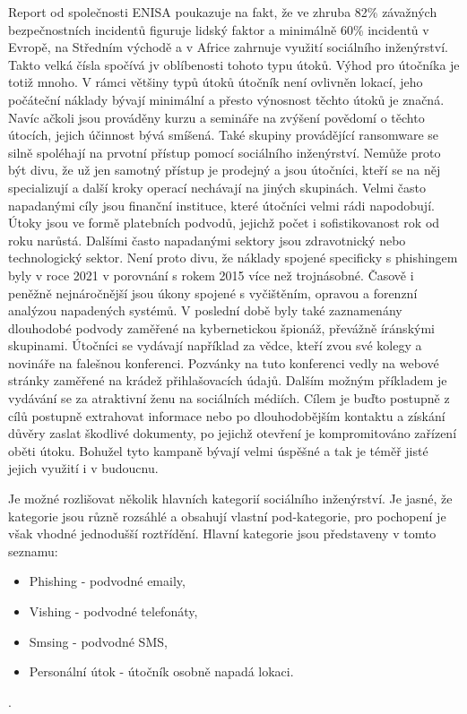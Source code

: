 Report od společnosti \ac{ENISA} poukazuje na fakt, že ve zhruba 82\% závažných bezpečnostních incidentů figuruje lidský faktor a minimálně 60\% incidentů v Evropě, na Středním východě a v Africe zahrnuje využití sociálního inženýrství.
Takto velká čísla spočívá jv oblíbenosti tohoto typu útoků.
Výhod pro útočníka je totiž mnoho.
V rámci většiny typů útoků útočník není ovlivněn lokací, jeho počáteční náklady bývají minimální a přesto výnosnost těchto útoků je značná.
Navíc ačkoli jsou prováděny kurzu a semináře na zvýšení povědomí o těchto útocích, jejich účinnost bývá smíšená.
Také skupiny provádějící ransomware se silně spoléhají na prvotní přístup pomocí sociálního inženýrství.
Nemůže proto být divu, že už jen samotný přístup je prodejný a jsou útočníci, kteří se na něj specializují a další kroky operací nechávají na jiných skupinách.
Velmi často napadanými cíly jsou finanční instituce, které útočníci velmi rádi napodobují.
Útoky jsou ve formě platebních podvodů, jejichž počet i sofistikovanost rok od roku narůstá.
Dalšími často napadanými sektory jsou zdravotnický nebo technologický sektor.
Není proto divu, že náklady spojené specificky s phishingem byly v roce 2021 v porovnání s rokem 2015 více než trojnásobné.
Časově i peněžně nejnáročnější jsou úkony spojené s vyčištěním, opravou a forenzní analýzou napadených systémů.
V poslední době byly také zaznamenány dlouhodobé podvody zaměřené na kybernetickou špionáž, převážně íránskými skupinami.
Útočníci se vydávají například za vědce, kteří zvou své kolegy a novináře na falešnou konferenci.
Pozvánky na tuto konferenci vedly na  webové stránky zaměřené na krádež přihlašovacích údajů.
Dalším možným příkladem je vydávání se za atraktivní ženu na sociálních médiích.
Cílem je buďto postupně z cílů postupně extrahovat informace nebo po dlouhodobějším kontaktu a získání důvěry zaslat škodlivé dokumenty, po jejichž otevření je kompromitováno zařízení oběti útoku.
Bohužel tyto kampaně bývají velmi úspěšné a tak je téměř jisté jejich využití i v budoucnu.\cite{Enisa_thread_landscape}

Je možné rozlišovat několik hlavních kategorií sociálního inženýrství.
Je jasné, že kategorie jsou různě rozsáhlé a obsahují vlastní pod-kategorie, pro pochopení je však vhodné jednodušší roztřídění.
Hlavní kategorie jsou představeny v tomto seznamu:
\begin{itemize}
	\item Phishing - podvodné emaily,
	\item Vishing - podvodné telefonáty,
	\item Smsing - podvodné SMS,
	\item Personální útok - útočník osobně napadá lokaci.
\end{itemize}\cite{Enisa_thread_landscape, moje_bakalarka}.


